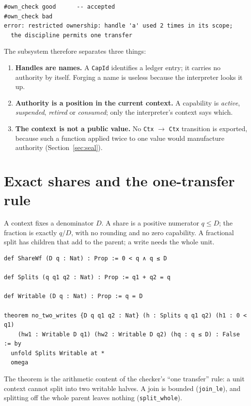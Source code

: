 \documentclass[10pt,a4paper]{article}
\newcommand{\file}[1]{\texttt{\small #1}}
\begin{document}
\begin{lstlisting}[style=out]
#own_check good      -- accepted
#own_check bad
error: restricted ownership: handle 'a' used 2 times in its scope;
  the discipline permits one transfer
\end{lstlisting}

The subsystem therefore separates three things:

\begin{enumerate}[itemsep=2pt,topsep=2pt]
\item \textbf{Handles are names.} A \texttt{CapId} identifies a ledger entry; it
carries no authority by itself. Forging a name is useless because the interpreter
looks it up.
\item \textbf{Authority is a position in the current context.} A capability is
\emph{active}, \emph{suspended}, \emph{retired} or \emph{consumed}; only the
interpreter's context says which.
\item \textbf{The context is not a public value.} No \texttt{Ctx} $\to$ \texttt{Ctx}
transition is exported, because such a function applied twice to one value would
manufacture authority (Section~\ref{sec:seal}).
\end{enumerate}

\section{Exact shares and the one-transfer rule}

A context fixes a denominator $D$. A share is a positive numerator $q \le D$; the
fraction is exactly $q/D$, with no rounding and no zero capability. A fractional
split has children that add to the parent; a write needs the whole unit.

\begin{lstlisting}[caption={\file{Cap/Share.lean}.}]
def ShareWf (D q : Nat) : Prop := 0 < q ∧ q ≤ D

def Splits (q q1 q2 : Nat) : Prop := q1 + q2 = q

def Writable (D q : Nat) : Prop := q = D

theorem no_two_writes {D q q1 q2 : Nat} (h : Splits q q1 q2) (h1 : 0 < q1)
    (hw1 : Writable D q1) (hw2 : Writable D q2) (hq : q ≤ D) : False := by
  unfold Splits Writable at *
  omega
\end{lstlisting}

The theorem is the arithmetic content of the checker's ``one transfer'' rule: a
unit context cannot split into two writable halves. A join is bounded
(\texttt{join\_le}), and splitting off the whole parent leaves nothing
(\texttt{split\_whole}).
\end{document}
